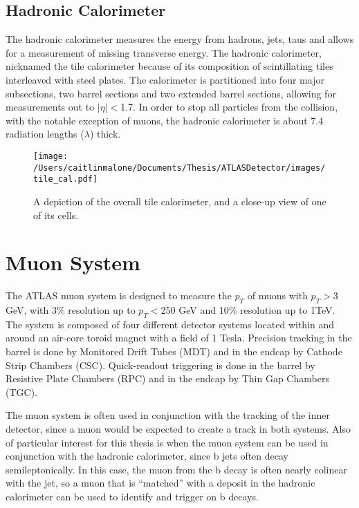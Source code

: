 \subsection{Hadronic Calorimeter} 
\label{sec:h_cal}
The hadronic calorimeter measures the energy from hadrons, jets, taus and allows for a measurement of missing transverse energy.  The hadronic calorimeter, nicknamed the tile calorimeter because of its composition of scintillating tiles interleaved with steel plates.  The calorimeter is partitioned into four major subsections, two barrel sections and two extended barrel sections, allowing for measurements out to $|\eta|<$1.7.  In order to stop all particles from the collision, with the notable exception of muons, the hadronic calorimeter is about 7.4 radiation lengths ($\lambda$) thick.

\begin{figure}
	\texttt{[image: /Users/caitlinmalone/Documents/Thesis/ATLASDetector/images/tile\_cal.pdf]}
	\label{fig:tile_cal}
	\caption{A depiction of the overall tile calorimeter, and a close-up view of one of its cells.}
\end{figure}



\section{Muon System}
\label{sec:ms}
The ATLAS muon system is designed to measure the $p_T$ of muons with $p_T>$3 GeV, with 3\% resolution up to $p_T<$250 GeV and 10\% resolution up to 1TeV.  The system is composed of four different detector systems located within and around an air-core toroid magnet with a field of 1 Tesla.  Precision tracking in the barrel is done by Monitored Drift Tubes (MDT) and in the endcap by Cathode Strip Chambers (CSC).  Quick-readout triggering is done in the barrel by Resistive Plate Chambers (RPC) and in the endcap by Thin Gap Chambers (TGC).  

The muon system is often used in conjunction with the tracking of the inner detector, since a muon would be expected to create a track in both systems.  Also of particular interest for this thesis is when the muon system can be used in conjunction with the hadronic calorimeter, since b jets often decay semileptonically.  In this case, the muon from the b decay is often nearly colinear with the jet, so a muon that is ``matched'' with a deposit in the hadronic calorimeter can be used to identify and trigger on b decays.  

